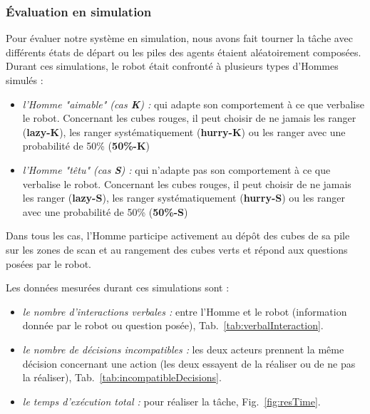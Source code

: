 \documentclass[english,a4paper,11pt,twoside]{StyleThese}
\begin{document}
\subsubsection{Évaluation en simulation}

Pour évaluer notre système en simulation, nous avons fait tourner la tâche avec différents états de départ ou les piles des agents étaient aléatoirement composées. Durant ces simulations, le robot était confronté à plusieurs types d'Hommes simulés :
\begin{itemize}
\item \textit{l'Homme "aimable" (cas \textbf{K}) :} qui adapte son comportement à ce que verbalise le robot. Concernant les cubes rouges, il peut choisir de ne jamais les ranger (\textbf{lazy-K}), les ranger systématiquement (\textbf{hurry-K}) ou les ranger avec une probabilité de 50\% (\textbf{50\%-K})
\item \textit{l'Homme "têtu" (cas \textbf{S}) :} qui n'adapte pas son comportement à ce que verbalise le robot. Concernant les cubes rouges, il peut choisir de ne jamais les ranger (\textbf{lazy-S}), les ranger systématiquement (\textbf{hurry-S}) ou les ranger avec une probabilité de 50\% (\textbf{50\%-S})
\end{itemize}
Dans tous les cas, l'Homme participe activement au dépôt des cubes de sa pile sur les zones de scan et au rangement des cubes verts et répond aux questions posées par le robot.

Les données mesurées durant ces simulations sont :
\begin{itemize}
\item \textit{le nombre d'interactions verbales :} entre l'Homme et le robot (information donnée par le robot ou question posée), Tab.~\ref{tab:verbalInteraction}.
\item \textit{le nombre de décisions incompatibles :} les deux acteurs prennent la même décision concernant une action (les deux essayent de la réaliser ou de ne pas la réaliser), Tab.~\ref{tab:incompatibleDecisions}.
\item \textit{le temps d'exécution total :} pour réaliser la tâche, Fig.~\ref{fig:resTime}.
\end{itemize}
\end{document}
